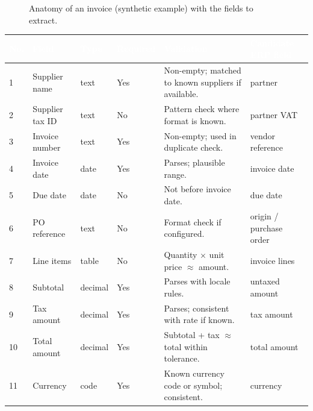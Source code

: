 \documentclass[11pt,a4paper]{report}
\newcommand{\hdr}[1]{\textcolor{white}{\sffamily\bfseries #1}}
\newcommand{\tblstart}{\rowcolors{2}{white}{rowgray}\arrayrulecolor{teal!60}}
\newcommand{\hdrrow}{\rowcolor{navy}}
\begin{document}
\begin{figure}[H]
{
}
\caption{Anatomy of an invoice (synthetic example) with the fields to extract.}\label{fig:invoice}
\end{figure}

{\tblstart\footnotesize
\begin{longtable}{L{0.7cm}L{2.7cm}L{1.4cm}L{1.4cm}L{4.0cm}L{2.6cm}}
\hdrrow \hdr{No.} & \hdr{Field} & \hdr{Type} & \hdr{Required} & \hdr{Validation} & \hdr{Candidate ERP field}\\  & Supplier name & text & Yes & Non-empty; matched to known suppliers if available. & partner\\
2 & Supplier tax ID & text & No & Pattern check where format is known. & partner VAT\\
3 & Invoice number & text & Yes & Non-empty; used in duplicate check. & vendor reference\\
4 & Invoice date & date & Yes & Parses; plausible range. & invoice date\\
5 & Due date & date & No & Not before invoice date. & due date\\
6 & PO reference & text & No & Format check if configured. & origin / purchase order\\
7 & Line items & table & No & Quantity $\times$ unit price $\approx$ amount. & invoice lines\\
8 & Subtotal & decimal & Yes & Parses with locale rules. & untaxed amount\\
9 & Tax amount & decimal & Yes & Parses; consistent with rate if known. & tax amount\\
10 & Total amount & decimal & Yes & Subtotal + tax $\approx$ total within tolerance. & total amount\\
11 & Currency & code & Yes & Known currency code or symbol; consistent. & currency\\
\hline
\end{longtable}}
\end{document}
